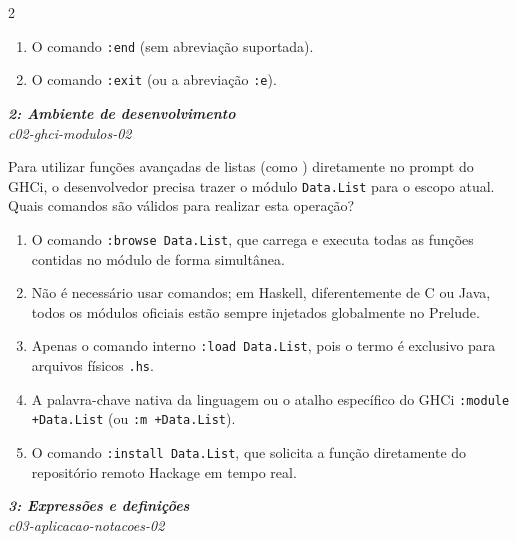 \documentclass[a4paper,10pt,brazil]{article}
\begin{document}
\begin{multicols}{2}
\begin{enumerate}
  \item O comando \texttt{:end} (sem abreviação suportada).

  \item O comando \texttt{:exit} (ou a abreviação \texttt{:e}).


\end{enumerate}

\begin{flushright}
  \footnotesize
  \textit{\textbf{2: Ambiente de desenvolvimento}}\\
  \textit{c02-ghci-modulos-02}\\

\end{flushright}
Para utilizar funções avançadas de listas (como ) diretamente no prompt do GHCi, o desenvolvedor precisa trazer o módulo \texttt{Data.List} para o escopo atual. Quais comandos são válidos para realizar esta operação?

\begin{enumerate}
  \item O comando \texttt{:browse Data.List}, que carrega e executa todas as funções contidas no módulo de forma simultânea.

  \item Não é necessário usar comandos; em Haskell, diferentemente de C ou Java, todos os módulos oficiais estão sempre injetados globalmente no Prelude.

  \item Apenas o comando interno \texttt{:load Data.List}, pois o termo  é exclusivo para arquivos físicos \texttt{.hs}.

  \item A palavra-chave nativa da linguagem  ou o atalho específico do GHCi \texttt{:module +Data.List} (ou \texttt{:m +Data.List}).

  \item O comando \texttt{:install Data.List}, que solicita a função diretamente do repositório remoto Hackage em tempo real.


\end{enumerate}

\begin{flushright}
  \footnotesize
  \textit{\textbf{3: Expressões e definições}}\\
  \textit{c03-aplicacao-notacoes-02}\\


\end{flushright}
\end{multicols}
\end{document}
